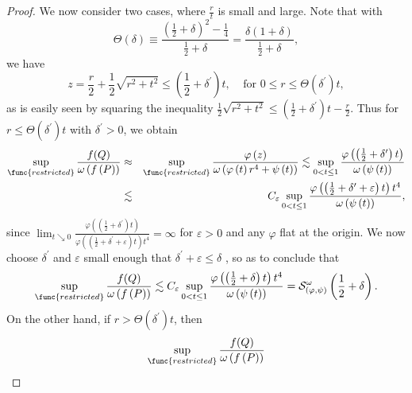 \documentclass{amsart}
\theoremstyle{plain}
\numberwithin{equation}{section}
\begin{document}
\begin{proof}
We now consider two cases, where $\frac{r}{t}$ is small and large. Note that
with 
\begin{equation*}
\Theta \left( \delta \right) \equiv \frac{\left( \frac{1}{2}+\delta \right)
^{2}-\frac{1}{4}}{\frac{1}{2}+\delta }=\frac{\delta \left( 1+\delta \right) 
}{\frac{1}{2}+\delta },
\end{equation*}%
we have%
\begin{equation*}
z=\frac{r}{2}+\frac{1}{2}\sqrt{r^{2}+t^{2}}\leq \left( \frac{1}{2}+\delta
^{\prime }\right) t,\ \ \ \ \ \text{for }0\leq r\leq \Theta \left( \delta
^{\prime }\right) t,
\end{equation*}%
as is easily seen by squaring the inequality $\frac{1}{2}\sqrt{r^{2}+t^{2}}%
\leq \left( \frac{1}{2}+\delta ^{\prime }\right) t-\frac{r}{2}$. Thus for $%
r\leq \Theta \left( \delta ^{\prime }\right) t$ with $\delta ^{\prime }>0$,
we obtain%
\begin{eqnarray*}
\sup_{\func{restricted}}\frac{f(Q)}{\omega \left( f\left( P\right) \right) }
&\approx &\sup_{\func{restricted}}\frac{\varphi \left( z\right) }{\omega
\left( \varphi \left( t\right) r^{4}+\psi \left( t\right) \right) }\lesssim
\sup_{0<t\leq 1}\frac{\varphi \left( \left( \frac{1}{2}+\delta ^{\prime
}\right) t\right) }{\omega \left( \psi \left( t\right) \right) } \\
&\lesssim &C_{\varepsilon }\sup_{0<t\leq 1}\frac{\varphi \left( \left( \frac{%
1}{2}+\delta ^{\prime }+\varepsilon \right) t\right) t^{4}}{\omega \left(
\psi \left( t\right) \right) },
\end{eqnarray*}%
since $\lim_{t\searrow 0}\frac{\varphi \left( \left( \frac{1}{2}+\delta
^{\prime }\right) t\right) }{\varphi \left( \left( \frac{1}{2}+\delta
^{\prime }+\varepsilon \right) t\right) t^{4}}=\infty $ for $\varepsilon >0$
and any $\varphi $ flat at the origin. We now choose $\delta ^{\prime }$ and 
$\varepsilon $ small enough that $\delta ^{\prime }+\varepsilon \leq \delta $%
, so as to conclude that%
\begin{equation*}
\sup_{\func{restricted}}\frac{f(Q)}{\omega \left( f\left( P\right) \right) }%
\lesssim C_{\varepsilon }\sup_{0<t\leq 1}\frac{\varphi \left( \left( \frac{1%
}{2}+\delta \right) t\right) t^{4}}{\omega \left( \psi \left( t\right)
\right) }=\mathcal{S}_{\left( \varphi ,\psi \right) }^{\omega }\left( \frac{1%
}{2}+\delta \right) .
\end{equation*}%
On the other hand, if $r>\Theta \left( \delta ^{\prime }\right) t$, then 
\begin{eqnarray*}
\sup_{\func{restricted}}\frac{f(Q)}{\omega \left( f\left( P\right) \right) }

\end{eqnarray*}
\end{proof}
\end{document}
